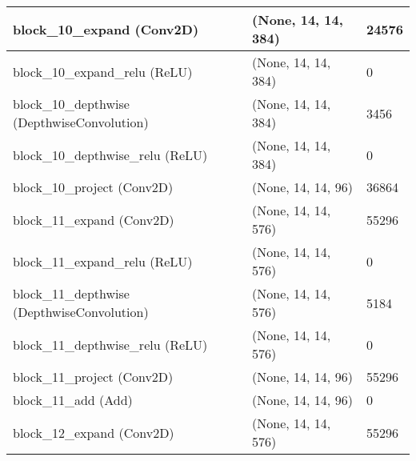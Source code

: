 \documentclass{article}
\begin{document}
\begin{center}
\begin{longtable}[h]{ p{}  p{}  p{}}
block\_10\_expand (Conv2D)                         & (None, 14, 14, 384)  & 24576    \\ \hline
block\_10\_expand\_relu (ReLU)                     & (None, 14, 14, 384)  & 0        \\ \hline
block\_10\_depthwise (DepthwiseConvolution)        & (None, 14, 14, 384)  & 3456     \\ \hline
block\_10\_depthwise\_relu (ReLU)                  & (None, 14, 14, 384)  & 0        \\ \hline
block\_10\_project (Conv2D)                        & (None, 14, 14, 96)   & 36864    \\ \hline
block\_11\_expand (Conv2D)                         & (None, 14, 14, 576)  & 55296    \\ \hline
block\_11\_expand\_relu (ReLU)                     & (None, 14, 14, 576)  & 0        \\ \hline
block\_11\_depthwise (DepthwiseConvolution)        & (None, 14, 14, 576)  & 5184     \\ \hline
block\_11\_depthwise\_relu (ReLU)                  & (None, 14, 14, 576)  & 0        \\ \hline
block\_11\_project (Conv2D)                        & (None, 14, 14, 96)   & 55296    \\ \hline
block\_11\_add (Add)                               & (None, 14, 14, 96)   & 0        \\ \hline
block\_12\_expand (Conv2D)                         & (None, 14, 14, 576)  & 55296    \\ \hline

\end{longtable}
\end{center}
\end{document}
